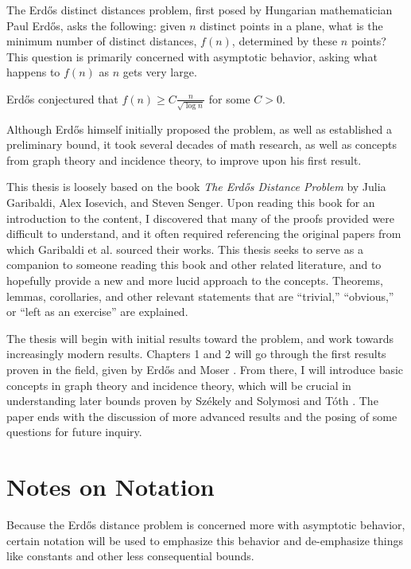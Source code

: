 \documentclass{scrippsthesisclass}
\theoremstyle{definition}
\begin{document}
The Erd\H{o}s distinct distances problem, first posed by Hungarian mathematician Paul Erd\H{o}s,  asks the following: given $n$ distinct points in a plane, what is the minimum number of distinct distances, $f(n)$, determined by these $n$ points? 
This question is primarily concerned with asymptotic behavior, asking what happens to $f(n)$ as $n$ gets very large.  

Erd\H{o}s conjectured that $f(n) \geq C\frac{n}{\sqrt{\log n}}$ for some $C > 0$.

Although Erd\H{o}s himself initially proposed the problem, as well as established a preliminary bound, it  took several decades of math research, as well as concepts from graph theory and incidence theory, to improve upon his first result. 

This thesis is loosely based on the book \textit{The Erd\H{o}s Distance Problem} by Julia Garibaldi, Alex Iosevich, and Steven Senger. 
Upon reading this book for an introduction to the content, I discovered that many of the proofs provided were difficult to understand, and it often required referencing the original papers from which Garibaldi et al. sourced their works. 
This thesis seeks to serve as a companion to someone reading this book and other related literature, and to hopefully provide a new and more lucid approach to the concepts.
Theorems, lemmas, corollaries, and other relevant statements that are ``trivial,'' ``obvious,'' or ``left as an exercise'' are explained. 

The thesis will begin with initial results toward the problem, and work towards increasingly modern results. 
Chapters 1 and 2 will go through the first results proven in the field, given by Erd\H{o}s \cite{Erdos46} and Moser \cite{Moser52}.
From there, I will introduce basic concepts in graph theory and incidence theory, which will be crucial in understanding later bounds proven by Sz\'{e}kely \cite{SzekelyPaper} and Solymosi and T\'{o}th \cite{Solymosi}. 
The paper ends with the discussion of more advanced results and the posing of some questions for future inquiry. 
\section{Notes on Notation}
Because the Erd\H{o}s distance problem is concerned more with asymptotic behavior, certain notation will be used to emphasize this behavior and de-emphasize things like constants and other less consequential bounds. 
\end{document}
